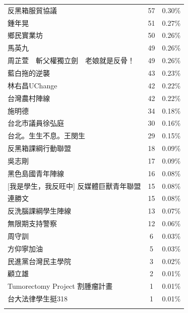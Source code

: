 \documentclass[a4paper, 10pt, conference]{ieeeconf}       %
\begin{document}
\begin{CJK}{UTF8}{bsmi}
\begin{longtable}[c]{@{}lcc@{}}
反黑箱服貿協議 & 57 & 0.30\% \\
鍾年晃 & 51 & 0.27\% \\
鄉民實業坊 & 50 & 0.26\% \\
馬英九 & 49 & 0.26\% \\
周芷萱　斬父權獨立劍　老娘就是反骨！ & 49 & 0.26\% \\
藍白拖的逆襲 & 43 & 0.23\% \\
林右昌UChange & 42 & 0.22\% \\
台灣農村陣線 & 42 & 0.22\% \\
施明德 & 34 & 0.18\% \\
台北市議員徐弘庭 & 30 & 0.16\% \\
台北。生生不息。王閔生 & 29 & 0.15\% \\
反黑箱課綱行動聯盟 & 18 & 0.09\% \\
吳志剛 & 17 & 0.09\% \\
黑色島國青年陣線 & 16 & 0.08\% \\
{[}我是學生，我反旺中{]} 反媒體巨獸青年聯盟 & 15 & 0.08\% \\
連勝文 & 15 & 0.08\% \\
反洗腦課綱學生陣線 & 13 & 0.07\% \\
無限期支持警察 & 12 & 0.06\% \\
周守訓 & 6 & 0.03\% \\
方仰寧加油 & 5 & 0.03\% \\
民進黨台灣民主學院 & 3 & 0.02\% \\
顧立雄 & 2 & 0.01\% \\
Tumorectomy Project 割腫瘤計畫 & 1 & 0.01\% \\
台大法律學生挺318 & 1 & 0.01\% \\* \bottomrule
\fi
\end{longtable}


\end{CJK}
\end{document}
